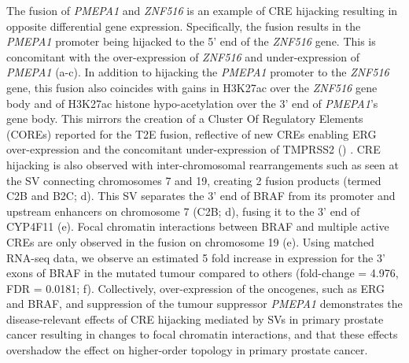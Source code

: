 The fusion of \emph{PMEPA1} and \emph{ZNF516} is an example of CRE hijacking resulting in opposite differential gene expression.
Specifically, the fusion results in the \emph{PMEPA1} promoter being hijacked to the 5' end of the \emph{ZNF516} gene.
This is concomitant with the over-expression of \emph{ZNF516} and under-expression of \emph{PMEPA1} (a-c).
In addition to hijacking the \emph{PMEPA1} promoter to the \emph{ZNF516} gene, this fusion also coincides with gains in H3K27ac over the \emph{ZNF516} gene body and of H3K27ac histone hypo-acetylation over the 3' end of \emph{PMEPA1}'s gene body.
This mirrors the creation of a Cluster Of Regulatory Elements (COREs) reported for the T2E fusion, reflective of new CREs enabling ERG over-expression and the concomitant under-expression of TMPRSS2 () \cite{kronTMPRSS2ERGFusion2017,tomlinsRecurrentFusionTMPRSS22005,tomlinsDistinctClassesChromosomal2007}.
CRE hijacking is also observed with inter-chromosomal rearrangements such as seen at the SV connecting chromosomes 7 and 19, creating 2 fusion products (termed C2B and B2C; d).
This SV separates the 3' end of BRAF from its promoter and upstream enhancers on chromosome 7 (C2B; d), fusing it to the 3' end of CYP4F11 (e).
Focal chromatin interactions between BRAF and multiple active CREs are only observed in the fusion on chromosome 19 (e).
Using matched RNA-seq data, we observe an estimated 5 fold increase in expression for the 3' exons of BRAF in the mutated tumour compared to others (fold-change = 4.976, FDR = 0.0181; f).
Collectively, over-expression of the oncogenes, such as ERG and BRAF, and suppression of the tumour suppressor \emph{PMEPA1} demonstrates the disease-relevant effects of CRE hijacking mediated by SVs in primary prostate cancer resulting in changes to focal chromatin interactions, and that these effects overshadow the effect on higher-order topology in primary prostate cancer.

